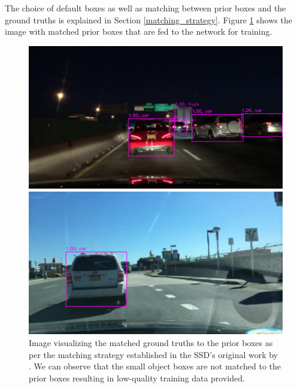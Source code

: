     The choice of default boxes as well as matching between prior boxes and the ground truths is explained in Section \ref{matching_strategy}. Figure \ref{fig:matching strategy basic} shows the image with matched prior boxes that are fed to the network for training.
    
    \begin{figure}
        \begin{center}
            \includegraphics[scale=0.35]{images/dataset_images/9.png}

            \includegraphics[scale=0.35]{images/dataset_images/10.png}

            \caption[Vanilla prior boxes matched to ground truth]{Image visualizing the matched ground truths to the prior boxes as per the matching strategy established in the SSD's original work by \citet{Liu2016SSDSS}. We can observe that the small object boxes are not matched to the prior boxes resulting in low-quality training data provided.}
            \label{fig:matching strategy basic}
        \end{center}
    \end{figure}
    
